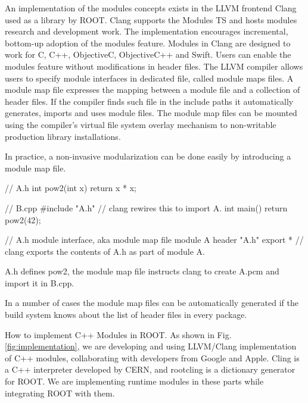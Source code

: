 \documentclass{webofc}
\begin{document}
An implementation of the modules concepts exists in the LLVM frontend Clang used as a library by ROOT. Clang supports the Modules TS and hosts modules research and development work. The implementation encourages incremental, bottom-up adoption of the modules feature. Modules in Clang are designed to work for C, C++, ObjectiveC, ObjectiveC++ and Swift. Users can enable the modules feature without modifications in header files. The LLVM compiler allows users to specify module interfaces in dedicated file, called module maps files. A module map file expresses the mapping between a module file and a collection of header files. If the compiler finds such file in the include paths it automatically generates, imports and uses module files. The module map files can be mounted using the compiler’s virtual file system overlay mechanism to non-writable production library installations.

In practice, a non-invasive modularization can be done easily by introducing a module map file.

\begin{listing}[h]
    \noindent
    \begin{minipage}[h]{.7\textwidth}
    \begin{cppcode*}{}
    // A.h   
    int pow2(int x) {
      return x * x;
    }

    // B.cpp
    #include "A.h" // clang rewires this to import A.
    int main() {
      return pow2(42);
    }

    // A.h module interface, aka module map file
    module A {
      header "A.h"
      export * // clang exports the contents of A.h as part of module A.
    }
    \end{cppcode*}
    \end{minipage}
\end{listing}

A.h defines pow2, the module map file instructs clang to create A.pcm and
import it in B.cpp.

In a number of cases the module map files can be automatically generated if the
build system knows about the list of header files in every package.

How to implement C++ Modules in ROOT.
As shown in Fig.\ref{fig:implementation}, we are developing and using LLVM/Clang implementation of C++ modules, collaborating with developers from Google and Apple.
Cling is a C++ interpreter developed by CERN, and rootcling is a dictionary generator for ROOT.
We are implementing runtime modules in these parts while integrating ROOT with them.
\end{document}
